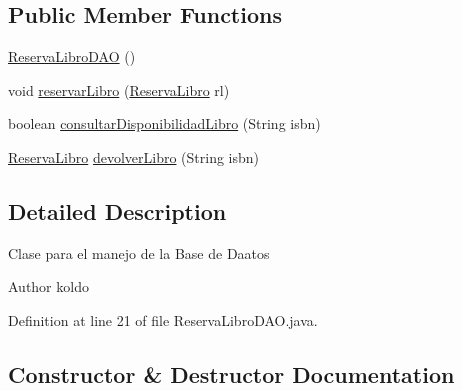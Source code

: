 \subsection*{Public Member Functions}
\begin{DoxyCompactItemize}
\item 
\mbox{\hyperlink{classes_1_1deusto_1_1spq_1_1biblioteca_1_1dao_1_1_reserva_libro_d_a_o_ac22f5dc38c52e6be38f54e6e31ab9b58}{Reserva\+Libro\+D\+AO}} ()
\item 
void \mbox{\hyperlink{classes_1_1deusto_1_1spq_1_1biblioteca_1_1dao_1_1_reserva_libro_d_a_o_ad7f9bfdd39cff8ea2e0ac07f506bfd4f}{reservar\+Libro}} (\mbox{\hyperlink{classes_1_1deusto_1_1spq_1_1biblioteca_1_1data_1_1_reserva_libro}{Reserva\+Libro}} rl)
\item 
boolean \mbox{\hyperlink{classes_1_1deusto_1_1spq_1_1biblioteca_1_1dao_1_1_reserva_libro_d_a_o_adf3ff587646760b081c538ca54512c3b}{consultar\+Disponibilidad\+Libro}} (String isbn)
\item 
\mbox{\hyperlink{classes_1_1deusto_1_1spq_1_1biblioteca_1_1data_1_1_reserva_libro}{Reserva\+Libro}} \mbox{\hyperlink{classes_1_1deusto_1_1spq_1_1biblioteca_1_1dao_1_1_reserva_libro_d_a_o_a6de362edada8a27bc4403808aafba6a1}{devolver\+Libro}} (String isbn)
\end{DoxyCompactItemize}


\subsection{Detailed Description}
Clase para el manejo de la Base de Daatos \begin{DoxyAuthor}{Author}
koldo 
\end{DoxyAuthor}


Definition at line 21 of file Reserva\+Libro\+D\+A\+O.\+java.



\subsection{Constructor \& Destructor Documentation}
\mbox{\label{classes_1_1deusto_1_1spq_1_1biblioteca_1_1dao_1_1_reserva_libro_d_a_o_ac22f5dc38c52e6be38f54e6e31ab9b58}} 
